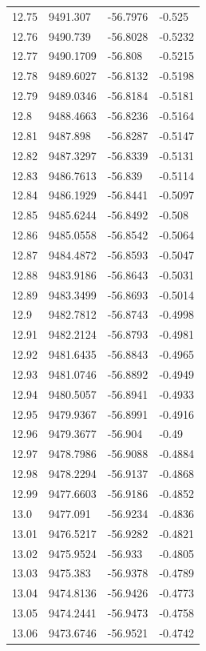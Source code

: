 \begin{table}[H]
\begin{tabular}{llll}
12.75 & 9491.307 & -56.7976 & -0.525 \\
12.76 & 9490.739 & -56.8028 & -0.5232 \\
12.77 & 9490.1709 & -56.808 & -0.5215 \\
12.78 & 9489.6027 & -56.8132 & -0.5198 \\
12.79 & 9489.0346 & -56.8184 & -0.5181 \\
12.8 & 9488.4663 & -56.8236 & -0.5164 \\
12.81 & 9487.898 & -56.8287 & -0.5147 \\
12.82 & 9487.3297 & -56.8339 & -0.5131 \\
12.83 & 9486.7613 & -56.839 & -0.5114 \\
12.84 & 9486.1929 & -56.8441 & -0.5097 \\
12.85 & 9485.6244 & -56.8492 & -0.508 \\
12.86 & 9485.0558 & -56.8542 & -0.5064 \\
12.87 & 9484.4872 & -56.8593 & -0.5047 \\
12.88 & 9483.9186 & -56.8643 & -0.5031 \\
12.89 & 9483.3499 & -56.8693 & -0.5014 \\
12.9 & 9482.7812 & -56.8743 & -0.4998 \\
12.91 & 9482.2124 & -56.8793 & -0.4981 \\
12.92 & 9481.6435 & -56.8843 & -0.4965 \\
12.93 & 9481.0746 & -56.8892 & -0.4949 \\
12.94 & 9480.5057 & -56.8941 & -0.4933 \\
12.95 & 9479.9367 & -56.8991 & -0.4916 \\
12.96 & 9479.3677 & -56.904 & -0.49 \\
12.97 & 9478.7986 & -56.9088 & -0.4884 \\
12.98 & 9478.2294 & -56.9137 & -0.4868 \\
12.99 & 9477.6603 & -56.9186 & -0.4852 \\
13.0 & 9477.091 & -56.9234 & -0.4836 \\
13.01 & 9476.5217 & -56.9282 & -0.4821 \\
13.02 & 9475.9524 & -56.933 & -0.4805 \\
13.03 & 9475.383 & -56.9378 & -0.4789 \\
13.04 & 9474.8136 & -56.9426 & -0.4773 \\
13.05 & 9474.2441 & -56.9473 & -0.4758 \\
13.06 & 9473.6746 & -56.9521 & -0.4742 \\

\end{tabular}
\end{table}
